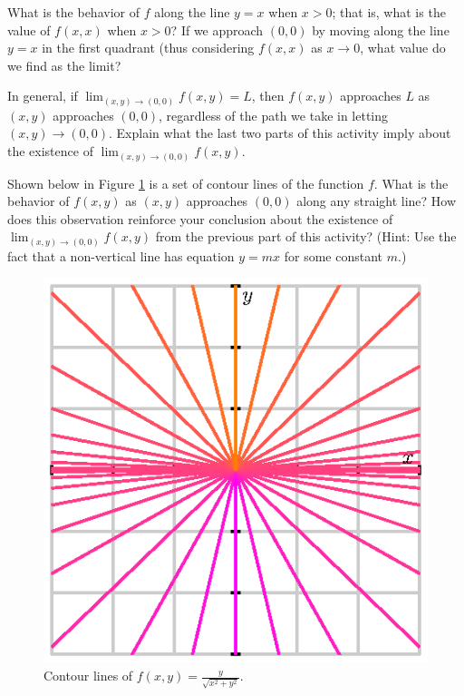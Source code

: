 \begin{activity}
\item What is the behavior of $f$ along the line $y=x$ when $x> 0$;  that
  is, what is the value of $f(x,x)$ when $x>0$?  If we approach $(0,0)$ by moving
  along the line $y=x$ in the first quadrant (thus considering $f(x,x)$ as $x \to 0$, what value do we find as the limit?

\item In general, if $\lim_{(x,y)\to(0,0)}f(x,y) = L$, then $f(x,y)$ approaches
  $L$ as $(x,y)$ approaches $(0,0)$, regardless of the path we take in letting $(x,y) \to (0,0)$.   Explain what the last two parts
  of this activity imply about the existence of $\lim_{(x,y)\to(0,0)} f(x,y)$.

\item Shown below in Figure \ref{F:10.1.limit_contour_2} is a set of
  contour lines of the function $f$.  What is the behavior of
  $f(x,y)$ as $(x,y)$ approaches $(0,0)$ along any straight line?  
  How does this observation reinforce your conclusion about the
  existence of $\lim_{(x,y)\to(0,0)}f(x,y)$ from the previous part of
  this activity? (Hint: Use the fact that a non-vertical line has equation $y=mx$ for some constant $m$.)

  \begin{figure}[ht]
    \begin{center}
      \includegraphics{figures/fig_10_1_limit_contour_2.eps}
      \caption{Contour lines of $f(x,y) = \frac{y}{\sqrt{x^2+y^2}}$.}
      \label{F:10.1.limit_contour_2}
    \end{center}
  \end{figure}

	
	
	\ea
\end{activity}

